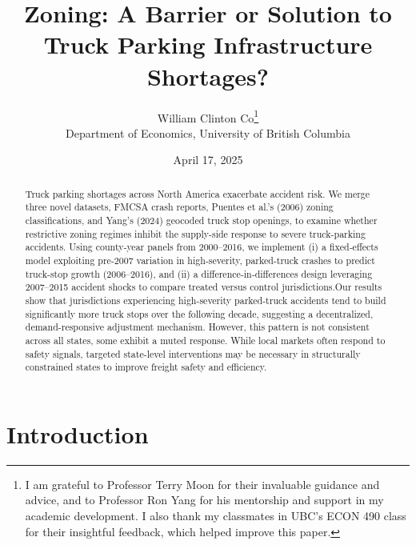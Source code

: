 \documentclass[
  12pt]{article}
\begin{document}
\def\spacingset#1{\renewcommand{\baselinestretch}%
{#1}\small\normalsize} \spacingset{1}



\date{April 17, 2025}
\title{\bf Zoning: A Barrier or Solution to Truck Parking Infrastructure
Shortages?}
\author{
William Clinton Co\thanks{I am grateful to Professor Terry Moon for
their invaluable guidance and advice, and to Professor Ron Yang for his
mentorship and support in my academic development. I also thank my
classmates in UBC's ECON 490 class for their insightful feedback, which
helped improve this paper.}\\
Department of Economics, University of British Columbia\\
}
\maketitle

\bigskip
\bigskip
\begin{abstract}
Truck parking shortages across North America exacerbate accident risk.
We merge three novel datasets, FMCSA crash reports, Puentes et al.'s
(2006) zoning classifications, and Yang's (2024) geocoded truck stop
openings, to examine whether restrictive zoning regimes inhibit the
supply-side response to severe truck-parking accidents. Using
county‑year panels from 2000--2016, we implement (i) a fixed‑effects
model exploiting pre‑2007 variation in high‑severity, parked‑truck
crashes to predict truck-stop growth (2006--2016), and (ii) a
difference‑in‑differences design leveraging 2007--2015 accident shocks
to compare treated versus control jurisdictions.Our results show that
jurisdictions experiencing high-severity parked-truck accidents tend to
build significantly more truck stops over the following decade,
suggesting a decentralized, demand-responsive adjustment mechanism.
However, this pattern is not consistent across all states, some exhibit
a muted response. While local markets often respond to safety signals,
targeted state-level interventions may be necessary in structurally
constrained states to improve freight safety and efficiency.
\end{abstract}


\newpage
\spacingset{1.9} %

\section{Introduction}\label{introduction}
\end{document}
